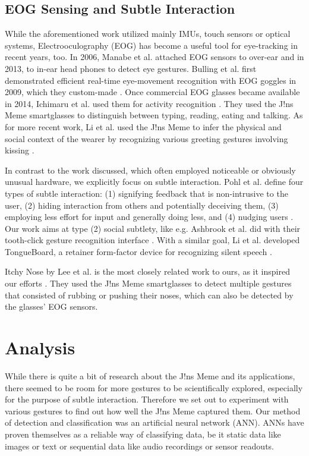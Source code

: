\documentclass[runningheads]{llncs}
\begin{document}
\subsection{EOG Sensing and Subtle Interaction}
While the aforementioned work utilized mainly IMUs, touch sensors or optical systems,
Electrooculography (EOG) has become a useful tool for eye-tracking in recent years, too. 
In 2006, Manabe et al. attached EOG sensors to over-ear \cite{10.1145/1125451.1125655}
and in 2013, to in-ear head phones \cite{10.1145/2493988.2494329} to detect eye gestures.
Bulling et al. first demonstrated efficient real-time eye-movement recognition
with EOG goggles in 2009, which they custom-made \cite{10.1145/1520340.1520468}.
Once commercial EOG glasses became available in 2014, Ichimaru et al. used them for
activity recognition \cite{10.1145/2638728.2638795}. They used the J!ns Meme
smartglasses to distinguish between typing, reading, eating and talking.
As for more recent work, Li et al. used the J!ns Meme to infer the physical and social
context of the wearer by recognizing various greeting gestures involving kissing
\cite{10.1145/3384657.3384801}.

In contrast to the work discussed, which often employed noticeable or obviously unusual
hardware, we explicitly focus on subtle interaction. Pohl et al. define
four types of subtle interaction: (1) signifying feedback that is non-intrusive to the
user, (2) hiding interaction from others and potentially deceiving them, (3) employing
less effort for input and generally doing less, and (4) nudging users
\cite{10.1145/3290605.3300648}. Our work aims at type (2) social subtlety, like e.g.
Ashbrook et al. did with their tooth-click gesture recognition interface
\cite{10.1145/2935334.2935389}. With a similar goal, Li et al. developed TongueBoard,
a retainer form-factor device for recognizing silent speech \cite{10.1145/3311823.3311831}.

Itchy Nose by Lee et al. is the most closely related work to ours,
as it inspired our efforts \cite{10.1145/3123021.3123060}. They used the J!ns Meme
smartglasses to detect multiple gestures that consisted of rubbing or pushing their
noses, which can also be detected by the glasses' EOG sensors.

\section{Analysis}
While there is quite a bit of research about the J!ns Meme and its applications, there
seemed to be room for more gestures to be scientifically explored, especially for the
purpose of subtle interaction. Therefore we set out to experiment with various
gestures to find out how well the J!ns Meme captured them. Our method of detection and
classification was an artificial neural network (ANN). ANNs have proven themselves as
a reliable way of classifying data, be it static data like images or text or sequential
data like audio recordings or sensor readouts.
\end{document}
